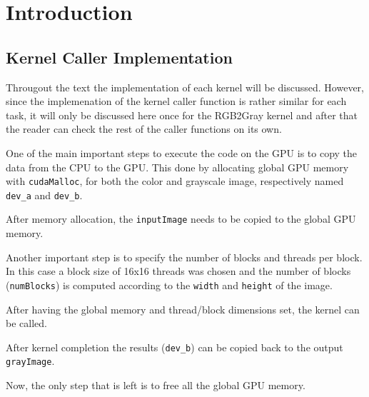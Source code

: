 \documentclass[final]{report}
\begin{document}
\chapter{Introduction}


\section{Kernel Caller Implementation}
Througout the text the implementation of each kernel will be discussed.
However, since the implemenation of the kernel caller function is rather similar for each task, it will only be discussed here once for the RGB2Gray kernel and after that the reader can check the rest of the caller functions on its own.

One of the main important steps to execute the code on the GPU is to copy the data from the CPU to the GPU.
This done by allocating global GPU memory with \texttt{cudaMalloc}, for both the color and grayscale image, respectively named \texttt{dev\_a} and \texttt{dev\_b}.

After memory allocation, the \texttt{inputImage} needs to be copied to the global GPU memory.


Another important step is to specify the number of blocks and threads per block.
In this case a block size of 16x16 threads was chosen and the number of blocks (\texttt{numBlocks}) is computed according to the \texttt{width} and \texttt{height} of the image.


After having the global memory and thread/block dimensions set, the kernel can be called.


After kernel completion the results (\texttt{dev\_b}) can be copied back to the output \texttt{grayImage}.


Now, the only step that is left is to free all the global GPU memory.

\end{document}
